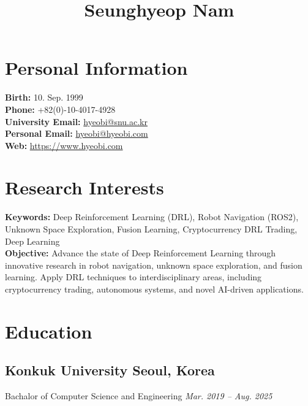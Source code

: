 \documentclass[11pt,a4paper]{article}
\makeatletter
\renewcommand{\maketitle}{
    \begin{center}
        \vspace*{-1in}
        {\LARGE \bfseries \@title \par}
        \vspace{0.5em}
        {\large \@author \par}
        \vspace{1em}
        {\@date \par}
    \end{center}
    \vspace{1em}
}
\makeatother
\begin{document}
\title{\textbf{Seunghyeop Nam}}
\author{}
\date{}
\maketitle

\section*{Personal Information}
\textbf{Birth:} 10. Sep. 1999 \\
\textbf{Phone:} +82(0)-10-4017-4928 \\
\textbf{University Email:} \href{mailto:hyeobi@snu.ac.kr}{hyeobi@snu.ac.kr} \\
\textbf{Personal Email:} \href{mailto:hyeobi@hyeobi.com}{hyeobi@hyeobi.com} \\
\textbf{Web:} \href{https://www.hyeobi.com}{https://www.hyeobi.com}

\section*{Research Interests}
\textbf{Keywords:} Deep Reinforcement Learning (DRL), Robot Navigation (ROS2), Unknown Space Exploration, Fusion Learning, Cryptocurrency DRL Trading, Deep Learning \\
\textbf{Objective:} Advance the state of Deep Reinforcement Learning through innovative research in robot navigation, unknown space exploration, and fusion learning. Apply DRL techniques to interdisciplinary areas, including cryptocurrency trading, autonomous systems, and novel AI-driven applications.

\section*{Education}
\subsection*{\textbf{Konkuk University} \hfill Seoul, Korea}
Bachalor of Computer Science and Engineering \hfill \textit{Mar. 2019 – Aug. 2025}
\end{document}
